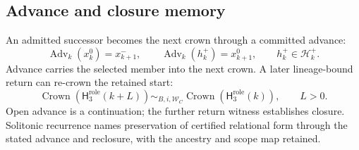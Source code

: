 \subsection{Advance and closure memory}
\label{subsec:crown}
An admitted successor becomes the next crown through a committed advance:
\begin{equation}
\operatorname{Adv}_k(x_k^0)=x_{k+1}^-,\qquad
\operatorname{Adv}_k(h_k^+)=x_{k+1}^0,\qquad h_k^+\in\mathcal H_k^+.
\label{eq:crown-advance}
\end{equation}
Advance carries the selected member into the next crown. A later
lineage-bound return can re-crown the retained start:
\begin{equation}
\operatorname{Crown}(\mathsf H_3^{\mathrm{role}}(k+L))
\sim_{B,i,\mathcal W_C}\operatorname{Crown}(\mathsf H_3^{\mathrm{role}}(k)),\qquad L>0.
\label{eq:closure-memory}
\end{equation}
Open advance is a continuation; the further return witness establishes closure.
Solitonic recurrence names preservation of certified relational form through
the stated advance and reclosure, with the ancestry and scope map retained.

